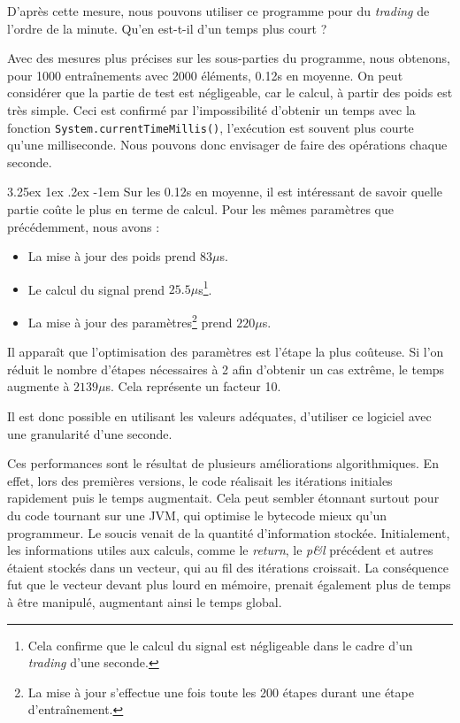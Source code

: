 \documentclass[a4paper, 11pt]{article}
\makeatletter
\renewcommand\paragraph{\@startsection{paragraph}{5}{\z@}%
  {3.25ex \@plus1ex \@minus.2ex}%
  {-1em}%
  {\normalfont\normalsize\bfseries}}
\makeatother
\begin{document}
D'après cette mesure, nous pouvons utiliser ce programme pour du \textit{trading} de l'ordre de la minute. Qu'en est-t-il d'un temps plus court ?

Avec des mesures plus précises sur les sous-parties du programme, nous obtenons, pour 1000 entraînements avec 2000 éléments, 0.12s en moyenne. On peut considérer que la partie de test est négligeable, car le calcul, à partir des poids est très simple. Ceci est confirmé par l'impossibilité d'obtenir un temps avec la fonction \lstinline|System.currentTimeMillis()|, l'exécution est souvent plus courte qu'une milliseconde.
Nous pouvons donc envisager de faire des opérations chaque seconde.

\paragraph{}
Sur les 0.12s en moyenne, il est intéressant de savoir quelle partie coûte le plus en terme de calcul.
Pour les mêmes paramètres que précédemment, nous avons :
\begin{itemize}
	\item La mise à jour des poids prend $83\mu$s.
	\item Le calcul du signal prend $25.5\mu$s\footnote{Cela confirme que le calcul du signal est négligeable dans le cadre d'un \textit{trading} d'une seconde.}.
	\item La mise à jour des paramètres\footnote{La mise à jour s'effectue une fois toute les 200 étapes durant une étape d'entraînement.} prend $220\mu$s.
\end{itemize}

Il apparaît que l'optimisation des paramètres est l'étape la plus coûteuse. Si l'on réduit le nombre d'étapes nécessaires à 2 afin d'obtenir un cas extrême, le temps augmente à $2139\mu$s. Cela représente un facteur 10.

Il est donc possible en utilisant les valeurs adéquates, d'utiliser ce logiciel avec une granularité d'une seconde.

Ces performances sont le résultat de plusieurs améliorations algorithmiques. En effet, lors des premières versions, le code réalisait les itérations initiales rapidement puis le temps augmentait. Cela peut sembler étonnant surtout pour du code tournant sur une JVM, qui optimise le bytecode mieux qu'un programmeur. Le soucis venait de la quantité d'information stockée. Initialement, les informations utiles aux calculs, comme le \textit{return}, le \textit{p\&l} précédent et autres étaient stockés dans un vecteur, qui au fil des itérations croissait. La conséquence fut que le vecteur devant plus lourd en mémoire, prenait également plus de temps à être manipulé, augmentant ainsi le temps global.
\end{document}
